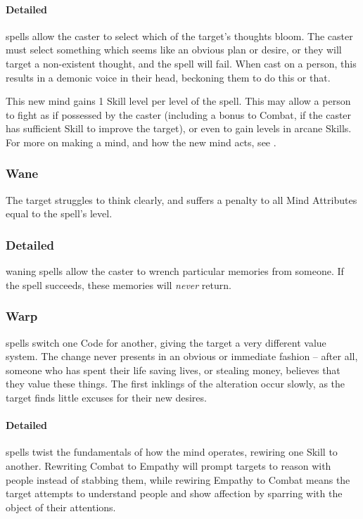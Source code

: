 \begin{multicols}{2}
    \paragraph{Detailed}
      spells allow the caster to select which of the target's thoughts bloom.
      The caster must select something which seems like an obvious plan or desire, or they will target a non-existent thought, and the spell will fail.
      When cast on a person, this results in a demonic voice in their head, beckoning them to do this or that.

      This new mind gains 1 Skill level per level of the spell.
      This may allow a person to fight as if possessed by the caster (including a bonus to Combat, if the caster has sufficient Skill to improve the target), or even to gain levels in arcane Skills.
    For more on making a mind, and how the new mind acts, see .


  \subsubsection{Wane}
    The target struggles to think clearly, and suffers a penalty to all Mind Attributes equal to the spell's level.

      \subsubsection{Detailed}
        waning spells allow the caster to wrench particular memories from someone.
        If the spell succeeds, these memories will \emph{never} return.
  \subsubsection{Warp}
    spells switch one Code for another, giving the target a very different value system.
    The change never presents in an obvious or immediate fashion -- after all, someone who has spent their life saving lives, or stealing money, believes that they value these things.
    The first inklings of the alteration occur slowly, as the target finds little excuses for their new desires.

      \paragraph{Detailed}
        spells twist the fundamentals of how the mind operates, rewiring one Skill to another.
        Rewriting Combat to Empathy will prompt targets to reason with people instead of stabbing them, while rewiring Empathy to Combat means the target attempts to understand people and show affection by sparring with the object of their attentions.


\end{multicols}
